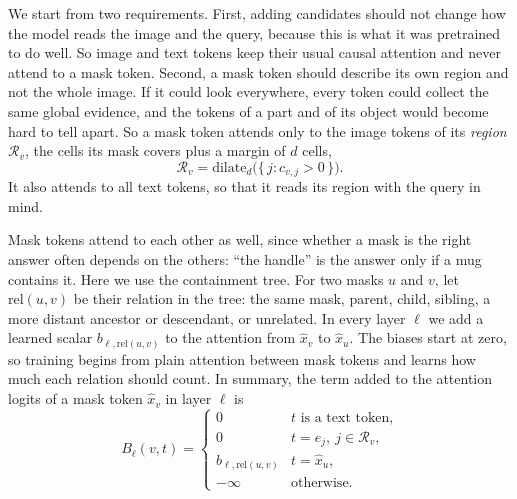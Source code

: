We start from two requirements. First, adding candidates should not change how the model reads the image and the
query, because this is what it was pretrained to do well. So image and text tokens keep their usual causal
attention and never attend to a mask token. Second, a mask token should describe its own region and not the whole
image. If it could look everywhere, every token could collect the same global evidence, and the tokens of a part
and of its object would become hard to tell apart. So a mask token attends only to the image tokens of its
\emph{region} $\mathcal{R}_v$, the cells its mask covers plus a margin of $d$ cells,
\begin{equation}
  \mathcal{R}_v=\mathrm{dilate}_d\big(\{\,j : c_{v,j}>0\,\}\big).
  \label{eq:region}
\end{equation}
It also attends to all text tokens, so that it reads its region with the query in mind.

Mask tokens attend to each other as well, since whether a mask is the right answer often depends on the others:
``the handle'' is the answer only if a mug contains it. Here we use the containment tree. For two masks $u$ and $v$,
let $\mathrm{rel}(u,v)$ be their relation in the tree: the same mask, parent, child, sibling, a more distant
ancestor or descendant, or unrelated. In every layer $\ell$ we add a learned scalar $b_{\ell,\mathrm{rel}(u,v)}$ to
the attention from $\hat{x}_v$ to $\hat{x}_u$. The biases start at zero, so training begins from plain attention
between mask tokens and learns how much each relation should count. In summary, the term added to the attention
logits of a mask token $\hat{x}_v$ in layer $\ell$ is
\begin{equation}
  B_\ell(v,t)=
  \begin{cases}
    0 & t \text{ is a text token,}\\
    0 & t=e_j,\ j\in\mathcal{R}_v,\\
    b_{\ell,\mathrm{rel}(u,v)} & t=\hat{x}_u,\\
    -\infty & \text{otherwise.}
  \end{cases}
  \label{eq:attention}
\end{equation}

